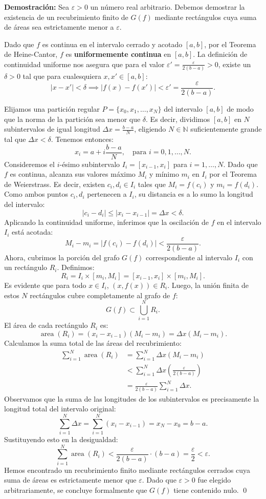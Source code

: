 \documentclass[11pt,a4paper]{article}
\begin{document}
\textbf{Demostración:}
Sea $\varepsilon > 0$ un número real arbitrario. Debemos demostrar la existencia de un recubrimiento finito de $G(f)$ mediante rectángulos cuya suma de áreas sea estrictamente menor a $\varepsilon$.

Dado que $f$ es continua en el intervalo cerrado y acotado $[a,b]$, por el Teorema de Heine-Cantor, $f$ es \textbf{uniformemente continua} en $[a,b]$.
La definición de continuidad uniforme nos asegura que para el valor $\varepsilon' = \frac{\varepsilon}{2(b-a)} > 0$, existe un $\delta > 0$ tal que para cualesquiera $x, x' \in [a,b]$:
\[
|x - x'| < \delta \implies |f(x) - f(x')| < \varepsilon' = \frac{\varepsilon}{2(b-a)}.
\]

Elijamos una partición regular $P = \{x_0, x_1, \dots, x_N\}$ del intervalo $[a,b]$ de modo que la norma de la partición sea menor que $\delta$. Es decir, dividimos $[a,b]$ en $N$ subintervalos de igual longitud $\Delta x = \frac{b-a}{N}$, eligiendo $N \in \mathbb{N}$ suficientemente grande tal que $\Delta x < \delta$. Tenemos entonces:
\[
x_i = a + i\frac{b-a}{N}, \quad \text{para } i=0, 1, \dots, N.
\]
Consideremos el $i$-ésimo subintervalo $I_i = [x_{i-1}, x_i]$ para $i=1, \dots, N$.
Dado que $f$ es continua, alcanza sus valores máximo $M_i$ y mínimo $m_i$ en $I_i$ por el Teorema de Weierstrass. Es decir, existen $c_i, d_i \in I_i$ tales que $M_i = f(c_i)$ y $m_i = f(d_i)$.
Como ambos puntos $c_i, d_i$ pertenecen a $I_i$, su distancia es a lo sumo la longitud del intervalo:
\[
|c_i - d_i| \leq |x_i - x_{i-1}| = \Delta x < \delta.
\]
Aplicando la continuidad uniforme, inferimos que la oscilación de $f$ en el intervalo $I_i$ está acotada:
\[
M_i - m_i = |f(c_i) - f(d_i)| < \frac{\varepsilon}{2(b-a)}.
\]
Ahora, cubrimos la porción del grafo $G(f)$ correspondiente al intervalo $I_i$ con un rectángulo $R_i$. Definimos:
\[
R_i = I_i \times [m_i, M_i] = [x_{i-1}, x_i] \times [m_i, M_i].
\]
Es evidente que para todo $x \in I_i$, $(x, f(x)) \in R_i$. Luego, la unión finita de estos $N$ rectángulos cubre completamente al grafo de $f$:
\[
G(f) \subset \bigcup_{i=1}^N R_i.
\]
El área de cada rectángulo $R_i$ es:
\[
\operatorname{area}(R_i) = (x_i - x_{i-1})(M_i - m_i) = \Delta x (M_i - m_i).
\]
Calculamos la suma total de las áreas del recubrimiento:
\begin{align*}
\sum_{i=1}^N \operatorname{area}(R_i) &= \sum_{i=1}^N \Delta x (M_i - m_i) \\
&< \sum_{i=1}^N \Delta x \left( \frac{\varepsilon}{2(b-a)} \right) \\
&= \frac{\varepsilon}{2(b-a)} \sum_{i=1}^N \Delta x.
\end{align*}
Observamos que la suma de las longitudes de los subintervalos es precisamente la longitud total del intervalo original:
\[
\sum_{i=1}^N \Delta x = \sum_{i=1}^N (x_i - x_{i-1}) = x_N - x_0 = b - a.
\]
Sustituyendo esto en la desigualdad:
\[
\sum_{i=1}^N \operatorname{area}(R_i) < \frac{\varepsilon}{2(b-a)} \cdot (b - a) = \frac{\varepsilon}{2} < \varepsilon.
\]
Hemos encontrado un recubrimiento finito mediante rectángulos cerrados cuya suma de áreas es estrictamente menor que $\varepsilon$. Dado que $\varepsilon > 0$ fue elegido arbitrariamente, se concluye formalmente que $G(f)$ tiene contenido nulo. \qed
\end{document}
